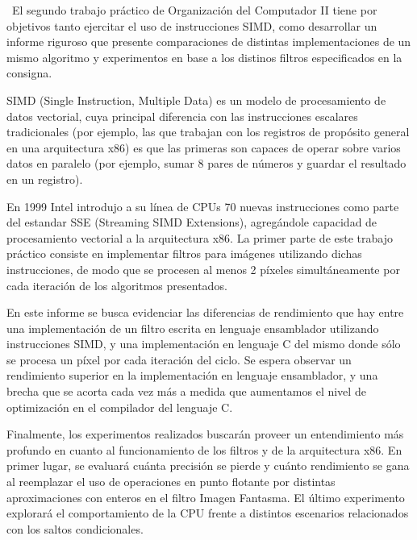 \ El segundo trabajo práctico de Organización del Computador II tiene por objetivos tanto ejercitar el uso de instrucciones SIMD, 
como desarrollar un informe riguroso que presente comparaciones de distintas implementaciones de un mismo algoritmo y experimentos en base 
a los distinos filtros especificados en la consigna. 
\par SIMD (Single Instruction, Multiple Data) es un modelo de procesamiento de datos vectorial, cuya principal diferencia con las instrucciones escalares
tradicionales (por ejemplo, las que trabajan con los registros de propósito general en una arquitectura x86) es que las primeras son capaces de operar sobre varios
datos en paralelo (por ejemplo, sumar 8 pares de números y guardar el resultado en un registro).
\par En 1999 Intel introdujo a su línea de CPUs 70 nuevas instrucciones como parte del estandar SSE (Streaming SIMD Extensions), agregándole capacidad de procesamiento
vectorial a la arquitectura x86. La primer parte de este trabajo práctico consiste en implementar filtros para imágenes utilizando dichas instrucciones, de modo que se 
procesen al menos 2 píxeles simultáneamente por cada iteración de los algoritmos presentados.
\par En este informe se busca evidenciar las diferencias de rendimiento que hay entre una implementación de un filtro escrita en lenguaje ensamblador utilizando instrucciones SIMD, 
y una implementación en lenguaje C del mismo donde sólo se procesa un píxel por cada iteración del ciclo. Se espera observar un rendimiento superior en la implementación 
en lenguaje ensamblador, y una brecha que se acorta cada vez más a medida que aumentamos el nivel de optimización en el compilador del lenguaje C.
\par Finalmente, los experimentos realizados buscarán proveer un entendimiento más profundo en cuanto al funcionamiento de los filtros y de la arquitectura x86. En primer lugar, 
se evaluará cuánta precisión se pierde y cuánto rendimiento se gana al reemplazar el uso de operaciones en punto flotante por distintas aproximaciones con enteros en el filtro Imagen Fantasma. 
El último experimento explorará el comportamiento de la CPU frente a distintos escenarios relacionados con los saltos condicionales. 